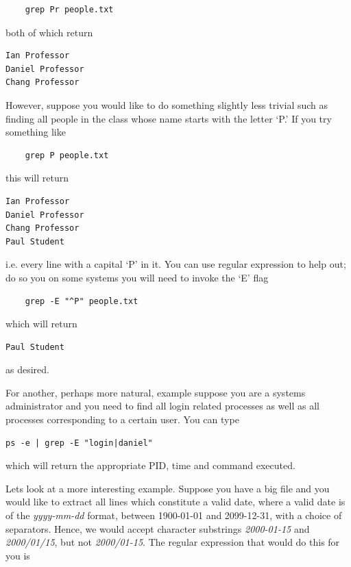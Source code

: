 \begin{verbatim}
    grep Pr people.txt
\end{verbatim}

both of which return

\begin{verbatim}
Ian Professor
Daniel Professor
Chang Professor
\end{verbatim}

However, suppose you would like to do something slightly less trivial such as finding all people in the class whose name starts with the letter `P.' If you try something like

\begin{verbatim}
    grep P people.txt
\end{verbatim}

this will return 


\begin{verbatim}
Ian Professor
Daniel Professor
Chang Professor
Paul Student
\end{verbatim}


i.e. every line with a capital `P' in it. You can use regular expression to help out; do so you on some systems you will need to invoke the `E' flag 

\begin{verbatim}
    grep -E "^P" people.txt
\end{verbatim}

which will return 

\begin{verbatim}
Paul Student
\end{verbatim}

as desired. 


For another, perhaps more natural, example suppose you are a systems administrator and you need to find all login related processes as well as all processes corresponding to a certain user.  You can type

\begin{verbatim}
ps -e | grep -E "login|daniel"
\end{verbatim}

which will return the appropriate PID, time and command executed.


Lets look at a more interesting example. Suppose you have a big file and you would like to extract all lines which constitute a valid date, where a valid date is of the \textit{yyyy-mm-dd} format, between 1900-01-01 and 2099-12-31, with a choice of separators. Hence, we would accept character substrings \textit{2000-01-15} and \textit{2000/01/15}, but not \textit{2000/01-15}. The regular expression that would do this for you is



